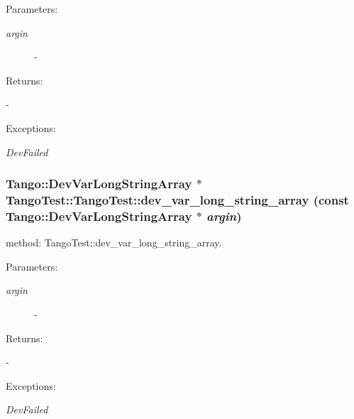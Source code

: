 \begin{Desc}
\item[Parameters: ]\par
\begin{description}
\item[{\em 
argin}]- \end{description}
\end{Desc}
\begin{Desc}
\item[Returns: ]\par
- \end{Desc}
\begin{Desc}
\item[Exceptions: ]\par
\begin{description}
\item[{\em 
Dev\-Failed}] \end{description}
\end{Desc}
\subsubsection{\setlength{\rightskip}{0pt plus 5cm}Tango::Dev\-Var\-Long\-String\-Array $\ast$ Tango\-Test::Tango\-Test::dev\_\-var\_\-long\_\-string\_\-array (const Tango::Dev\-Var\-Long\-String\-Array $\ast$ {\em argin})}\label{classTangoTest_1_1TangoTest_z5_20}


method: Tango\-Test::dev\_\-var\_\-long\_\-string\_\-array.

\begin{Desc}
\item[Parameters: ]\par
\begin{description}
\item[{\em 
argin}]- \end{description}
\end{Desc}
\begin{Desc}
\item[Returns: ]\par
- \end{Desc}
\begin{Desc}
\item[Exceptions: ]\par
\begin{description}
\item[{\em 
Dev\-Failed}] \end{description}
\end{Desc}
